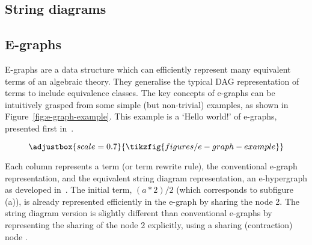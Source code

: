 \documentclass[peerreviewcls]{IEEEtran}
\begin{document}
\subsection{String diagrams}

\subsection{E-graphs}

E-graphs are a data structure which can efficiently represent many equivalent terms of an algebraic theory.  They generalise the typical DAG representation of terms to include equivalence classes.
The key concepts of e-graphs can be intuitively grasped from some simple (but non-trivial) examples, as shown in Figure~\ref{fig:e-graph-example}.
This example is a `Hello world!' of e-graphs, presented first in~\cite{EggPaper}.

\begin{figure*}
\[
\adjustbox{scale=0.7}{
\tikzfig{figures/e-graph-example}
}
\]
\caption{E-graph example (top) and its equivalent string diagram representation (bottom)}
\label{fig:e-graph-example}
\end{figure*}

Each column represents a term (or term rewrite rule), the conventional e-graph representation, and the equivalent string diagram representation, an e-hypergraph as developed in~\cite{ghica2024equivalencehypergraphsegraphsmonoidal}. 
The initial term, $(a*2)/2$ (which corresponds to subfigure (a)), is already represented efficiently in the e-graph by sharing the node 2.
The string diagram version is slightly different than conventional e-graphs by representing the sharing of the node 2 explicitly, using a sharing (contraction) node
. 
\end{document}

